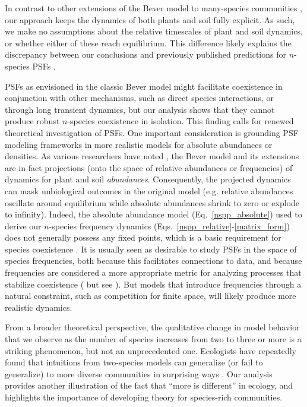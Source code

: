 \documentclass[11pt]{article}
\begin{document}
In contrast to other extensions of the Bever model to many-species communities \cite{eppinga2018frequency,mack2019plant}, our approach keeps the dynamics of both plants and soil fully explicit. As such, we make no assumptions about the relative timescales of plant and soil dynamics, or whether either of these reach equilibrium. This difference likely explains the discrepancy between our conclusions and previously published predictions for $n$-species PSFs \cite{kulmatiski2011testing,eppinga2018frequency,mack2019plant}.

PSFs as envisioned in the classic Bever model might facilitate coexistence in conjunction with other mechanisms, such as direct species interactions, or through long transient dynamics, but our analysis shows that they cannot produce robust $n$-species coexistence in isolation. This finding calls for renewed theoretical investigation of PSFs. One important consideration is grounding PSF modeling frameworks in more realistic models for absolute abundances or densities. As various researchers have noted \cite{revilla2013plant,eppinga2018frequency,ke2020effects}, the Bever model and its extensions are in fact projections (onto the space of relative abundances or frequencies) of dynamics for plant and soil \emph{abundances}. Consequently, the projected dynamics can mask unbiological outcomes in the original model (e.g. relative abundances oscillate around equilibrium while absolute abundances shrink to zero or explode to infinity). Indeed, the absolute abundance model (Eq.~\ref{nspp_absolute}) used to derive our $n$-species frequency dynamics (Eqs.~\ref{nspp_relative}-\ref{matrix_form}) does not generally possess any fixed points, which is a basic requirement for species coexistence \cite{hutson1990existence,hutson1992permanence}. It is usually seen as desirable to study PSFs in the space of species frequencies, both because this facilitates connections to data, and because frequencies are considered a more appropriate metric for analyzing processes that stabilize coexistence (\cite{adler2007niche,eppinga2018frequency} but see \cite{kandlikar2019winning,ke2020effects}). But models that introduce frequencies through a natural constraint, such as competition for finite space, will likely produce more realistic dynamics.

From a broader theoretical perspective, the qualitative change in model behavior that we observe as the number of species increases from two to three or more is a striking phenomenon, but not an unprecedented one. Ecologists have repeatedly found that intuitions from two-species models can generalize (or fail to generalize) to more diverse communities in surprising ways \cite{strobeck1973n,smale1976differential,barabas2016effect}. Our analysis provides another illustration of the fact that ``more is different'' \cite{anderson1972more} in ecology, and highlights the importance of developing theory for species-rich communities.
\end{document}

